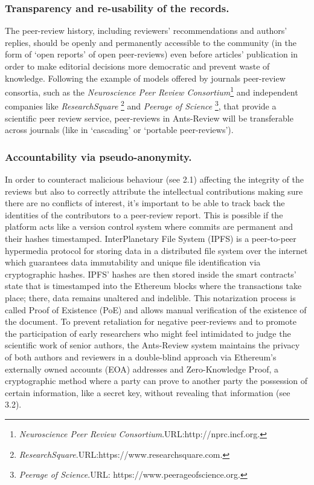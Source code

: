 \documentclass[runningheads]{llncs}
\begin{document}
\subsubsection{Transparency and re-usability of the records.} The peer-review history, including reviewers' recommendations and authors' replies, should be openly and permanently accessible to the community (in the form of `open reports' of open peer-reviews) even before articles' publication in order to  make editorial decisions more democratic and prevent waste of knowledge. Following the example of models offered by journals peer-review consortia, such as the \emph{Neuroscience Peer Review Consortium}\footnote[4]{\emph{Neuroscience Peer Review Consortium}.\textsc{URL:}http://nprc.incf.org.} and independent companies like \emph{ResearchSquare} \footnote[5]{\emph{ResearchSquare}.\textsc{URL:}https://www.researchsquare.com.} and \emph{Peerage of Science} \footnote[6]{\emph{Peerage of Science}.\textsc{URL:} https://www.peerageofscience.org.}, that provide a scientific peer review service, peer-reviews in Ants-Review will be transferable across journals (like in `cascading' or `portable peer-reviews').

\subsubsection{Accountability via pseudo-anonymity.} In order to counteract malicious behaviour (see 2.1) affecting the integrity of the reviews but also to correctly attribute the intellectual contributions making sure there are no conflicts of interest, it's important to be able to track back the identities of the contributors to a peer-review report. This is possible if the platform acts like a version control system where commits are permanent and their hashes timestamped. InterPlanetary File System (IPFS) \cite{IPFS} is a peer-to-peer hypermedia protocol for storing data in a distributed file system over the internet which guarantees data immutability and unique file identification via cryptographic hashes. IPFS' hashes are then stored inside the smart contracts' state that is timestamped into the Ethereum blocks where  the transactions take place; there, data remains unaltered and indelible. This notarization process is called Proof of Existence (PoE) and allows manual verification of the existence of the document.
\newline To prevent retaliation for negative peer-reviews and to promote the participation of early researchers who might feel intimidated to judge the scientific work of senior authors, the Ants-Review system maintains the privacy of both authors and reviewers in a double-blind approach via Ethereum’s externally owned accounts (EOA) addresses and Zero-Knowledge Proof, a cryptographic method where a party can prove to another party the possession of certain information, like a secret key, without revealing that information (see 3.2).
\end{document}
